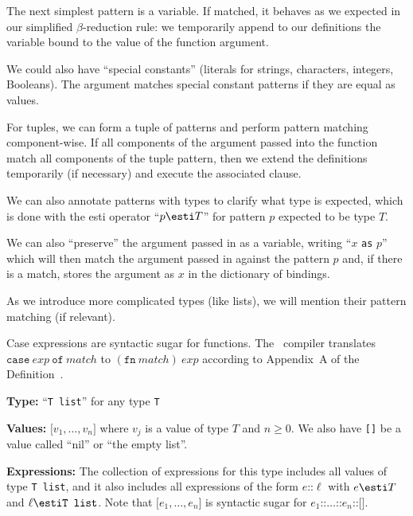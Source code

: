 \begin{node}
\begin{node}[Functions]
\begin{node}
The next simplest pattern is a variable. If matched, it behaves as we
expected in our simplified $\beta$-reduction rule: we temporarily append
to our definitions the variable bound to the value of the function argument.

We could also have ``special constants'' (literals for strings,
characters, integers, Booleans). The argument matches special constant
patterns if they are equal as values.

For tuples, we can form a tuple of patterns and perform pattern matching
component-wise. If all components of the argument passed into the
function match all components of the tuple pattern, then we extend the
definitions temporarily (if necessary) and execute the associated
clause.

We can also annotate patterns with types to clarify what type is
expected, which is done with the esti operator ``$p\esti T$'' for
pattern $p$ expected to be type $T$.

We can also ``preserve'' the argument passed in as a variable, writing
``$x$ \texttt{as} $p$'' which will then match the argument passed in
against the pattern $p$ and, if there is a match, stores the argument as
$x$ in the dictionary of bindings.

As we introduce more complicated types (like lists), we will mention
their pattern matching (if relevant).
\end{node}

\begin{node}[Remark]\label{sml-000K}%
Case expressions are syntactic sugar for functions. The \SML\ compiler
translates $\mathtt{case}~exp~\mathtt{of}~match$ to $(\mathtt{fn}~match)~exp$
according to Appendix~A of the Definition~\cite{milner1997definition}.
\end{node}
\end{node}

\begin{node}[Lists]\label{sml-000L}%
\textbf{Type:} ``\texttt{T list}'' for any type \texttt{T}

\textbf{Values:} $\texttt{[}v_{1},\dots,v_{n}\texttt{]}$ where
$v_{j}$ is a value of type $T$ and $n\geq0$. We also have \texttt{[]} be
a value called ``nil'' or ``the empty list''.

\textbf{Expressions:} The collection of expressions for this type
includes all values of type \texttt{T list}, and it also includes all
expressions of the form $e\texttt{::}\ell$ with $e\esti T$ and
$\ell\esti\texttt{T list}$. Note that $\texttt{[}e_{1},\dots,e_{n}\texttt{]}$
is syntactic sugar for $e_{1}\texttt{::}\dots\texttt{::}e_{n}\texttt{::}\texttt{[]}$.


\end{node}
\end{node}
